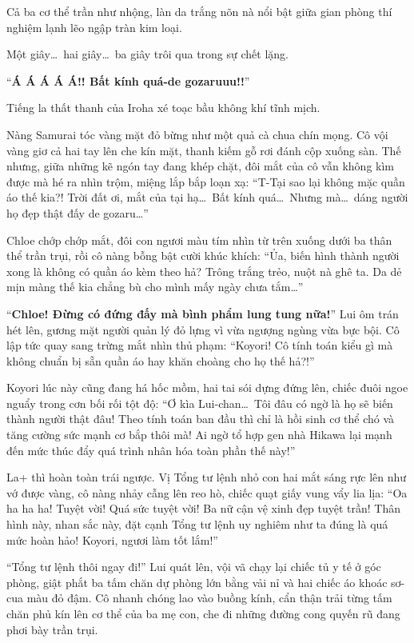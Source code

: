 \documentclass[../main.tex]{subfiles}
\begin{document}
Cả ba cơ thể trần như nhộng, làn da trắng nõn nà nổi bật giữa gian phòng thí nghiệm lạnh lẽo ngập tràn kim loại.

Một giây\dots\ hai giây\dots\ ba giây trôi qua trong sự chết lặng.

``\textbf{Á Á Á Á Á!! Bất kính quá-de gozaruuu!!}''

Tiếng la thất thanh của Iroha xé toạc bầu không khí tĩnh mịch.

Nàng Samurai tóc vàng mặt đỏ bừng như một quả cà chua chín mọng. Cô vội vàng giơ cả hai tay lên che kín mặt, thanh kiếm gỗ rơi đánh cộp xuống sàn. Thế nhưng, giữa những kẽ ngón tay đang khép chặt, đôi mắt của cô vẫn không kìm được mà hé ra nhìn trộm, miệng lắp bắp loạn xạ: ``T-Tại sao lại không mặc quần áo thế kia?! Trời đất ơi, mắt của tại hạ\dots\ Bất kính quá\dots\ Nhưng mà\dots\ dáng người họ đẹp thật đấy de gozaru\dots''

Chloe chớp chớp mắt, đôi con ngươi màu tím nhìn từ trên xuống dưới ba thân thể trần trụi, rồi cô nàng bỗng bật cười khúc khích: ``Ủa, biến hình thành người xong là không có quần áo kèm theo hả? Trông trắng trẻo, nuột nà ghê ta. Da dẻ mịn màng thế kia chẳng bù cho mình mấy ngày chưa tắm\dots''

``\textbf{Chloe! Đừng có đứng đấy mà bình phẩm lung tung nữa!}'' Lui ôm trán hét lên, gương mặt người quản lý đỏ lựng vì vừa ngượng ngùng vừa bực bội. Cô lập tức quay sang trừng mắt nhìn thủ phạm: ``Koyori! Cô tính toán kiểu gì mà không chuẩn bị sẵn quần áo hay khăn choàng cho họ thế hả?!''

Koyori lúc này cũng đang há hốc mồm, hai tai sói dựng đứng lên, chiếc đuôi ngoe nguẩy trong cơn bối rối tột độ: ``Ơ kìa Lui-chan\dots\ Tôi đâu có ngờ là họ sẽ biến thành người thật đâu! Theo tính toán ban đầu thì chỉ là hồi sinh cơ thể chó và tăng cường sức mạnh cơ bắp thôi mà! Ai ngờ tổ hợp gen nhà Hikawa lại mạnh đến mức thúc đẩy quá trình nhân hóa toàn phần thế này!''

La+ thì hoàn toàn trái ngược. Vị Tổng tư lệnh nhỏ con hai mắt sáng rực lên như vớ được vàng, cô nàng nhảy cẫng lên reo hò, chiếc quạt giấy vung vẩy lia lịa: ``Oa ha ha ha! Tuyệt vời! Quá sức tuyệt vời! Ba nữ cận vệ xinh đẹp tuyệt trần! Thân hình này, nhan sắc này, đặt cạnh Tổng tư lệnh uy nghiêm như ta đúng là quá mức hoàn hảo! Koyori, ngươi làm tốt lắm!''

``Tổng tư lệnh thôi ngay đi!'' Lui quát lên, vội vã chạy lại chiếc tủ y tế ở góc phòng, giật phắt ba tấm chăn dự phòng lớn bằng vải nỉ và hai chiếc áo khoác sơ-cua màu đỏ đậm. Cô nhanh chóng lao vào buồng kính, cẩn thận trải từng tấm chăn phủ kín lên cơ thể của ba mẹ con, che đi những đường cong quyến rũ đang phơi bày trần trụi.
\end{document}
